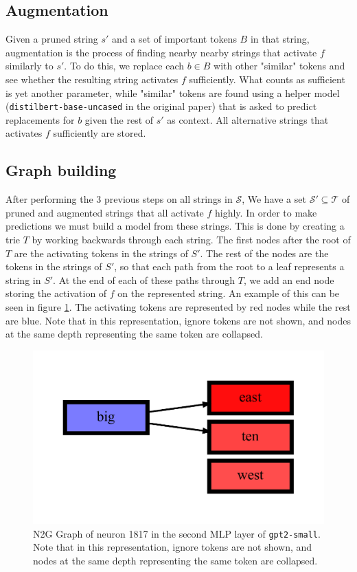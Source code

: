 \subsection{Augmentation}
Given a pruned string $s'$ and a set of important tokens $B$ in that string, 
augmentation is the process of finding nearby nearby strings 
that activate $f$ similarly to $s'$.
To do this, we replace each $b\in B$ with other "similar" tokens and 
see whether the resulting string activates $f$ sufficiently.
What counts as sufficient is yet another parameter, 
while "similar" tokens are found using a helper model 
(\texttt{distilbert-base-uncased} in the original paper) 
that is asked to predict replacements for $b$ 
given the rest of $s'$ as context.
All alternative strings that activates $f$ sufficiently are stored.

\subsection{Graph building}
After performing the 3 previous steps on all strings in $\mathcal S$, 
We have a set $\mathcal S'\subseteq\mathcal T$ 
of pruned and augmented strings that all activate $f$ highly.
In order to make predictions we must build a model from these strings.
This is done by creating a trie $T$ 
by working backwards through each string.
The first nodes after the root of $T$ are the activating tokens 
in the strings of $S'$.
The rest of the nodes are the tokens in the strings of $S'$, 
so that each path from the root to a leaf represents a string in $S'$.
At the end of each of these paths through $T$, 
we add an end node storing the activation of $f$ on the represented string.
An example of this can be seen in figure \ref{fig:n2g_graph_gpt2-small_2_1817}.
The activating tokens are represented by red nodes while the rest are blue.
Note that in this representation, ignore tokens are not shown, and nodes at the same depth representing the same token are collapsed.

\begin{figure}[h]
    \centering
    \includegraphics[width=\textwidth]{images/gpt2-small_2_1817.pdf}
    \caption{N2G Graph of neuron 1817 in the second MLP layer of \texttt{gpt2-small}. 
    Note that in this representation, ignore tokens are not shown, and nodes at the same depth representing the same token are collapsed.}
    \label{fig:n2g_graph_gpt2-small_2_1817}
\end{figure}

